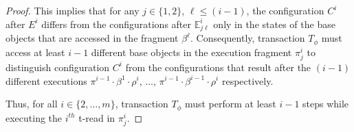 \begin{proof}
This implies that for any $j\in \{1,2\}$, $\ell \leq (i-1)$, the configuration $C^i$ after $E^i$ differs from the configurations
after $\mathbb{E}_{j\ell}^{i}$ only in the states of the base objects that are accessed in the fragment $\beta^{\ell}$.
Consequently, transaction $T_{\phi}$ must access at least $i-1$ different base objects
in the execution fragment $\pi_j^i$
to distinguish configuration $C^i$ from the configurations
that result after the $(i-1)$ different executions 
$\pi^{i-1}\cdot\beta^{1}\cdot \rho^i$, $\ldots$, $\pi^{i-1}\cdot\beta^{i-1}\cdot \rho^i$ respectively.

Thus, for all $i \in \{2,\ldots, m\}$, transaction $T_{\phi}$ must perform at least $i-1$ steps 
while executing the $i^{th}$ t-read in $\pi_{j}^i$.


\end{proof}

